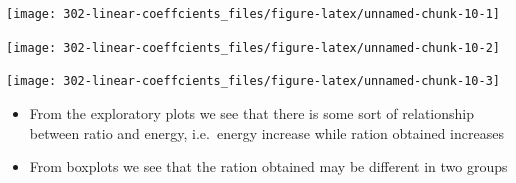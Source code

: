 \documentclass[
]{book}
\newenvironment{Shaded}{\begin{snugshade}}{\end{snugshade}}
\newcommand{\CommentTok}[1]{\textcolor[rgb]{0.56,0.35,0.01}{\textit{#1}}}
\newcommand{\DataTypeTok}[1]{\textcolor[rgb]{0.13,0.29,0.53}{#1}}
\newcommand{\DecValTok}[1]{\textcolor[rgb]{0.00,0.00,0.81}{#1}}
\newcommand{\KeywordTok}[1]{\textcolor[rgb]{0.13,0.29,0.53}{\textbf{#1}}}
\newcommand{\NormalTok}[1]{#1}
\newcommand{\OperatorTok}[1]{\textcolor[rgb]{0.81,0.36,0.00}{\textbf{#1}}}
\newcommand{\StringTok}[1]{\textcolor[rgb]{0.31,0.60,0.02}{#1}}
\providecommand{\tightlist}{%
  \setlength{\itemsep}{0pt}\setlength{\parskip}{0pt}}
\theoremstyle{definition}
\theoremstyle{definition}
\theoremstyle{definition}
\theoremstyle{remark}
\begin{document}
\begin{center}\texttt{[image: 302-linear-coeffcients\_files/figure-latex/unnamed-chunk-10-1]} \end{center}

\begin{Shaded}
\end{Shaded}

\begin{center}\texttt{[image: 302-linear-coeffcients\_files/figure-latex/unnamed-chunk-10-2]} \end{center}

\begin{Shaded}
\end{Shaded}

\begin{center}\texttt{[image: 302-linear-coeffcients\_files/figure-latex/unnamed-chunk-10-3]} \end{center}

\begin{itemize}
\tightlist
\item
  From the exploratory plots we see that there is some sort of relationship between ratio and energy, i.e.~energy increase while ration obtained increases
\item
  From boxplots we see that the ration obtained may be different in two groups
\end{itemize}
\end{document}

